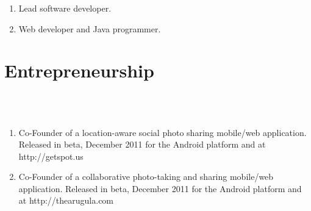 \documentclass[line]{res}
\begin{document}
\begin{resume}
\begin{enumerate}
		\item {} 
		\begin{position}
			Lead software developer. 
		\end{position}
		
		\item {} 
		\begin{position}
			Web developer and Java programmer. 
		\end{position}
	\end{enumerate}
	
	
	\section{\sc Entrepreneurship}
	\begin{format}
		\\
		\body\\
	\end{format}
	\begin{enumerate}
		\item {}
		\begin{position}
			Co-Founder of a location-aware social photo sharing mobile/web application. Released
      in beta, December 2011 for the Android platform and at http://getspot.us
		\end{position}
		
		\item {}
		\begin{position}
			Co-Founder of a collaborative photo-taking and sharing mobile/web
      application. Released in beta, December 2011 for the Android platform and at
      http://thearugula.com
		\end{position}
		
	\end{enumerate}
	
	\clearpage
	

\end{resume}
\end{document}
